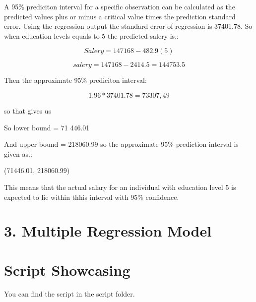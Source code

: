 \documentclass[
  letterpaper,
  DIV=11,
  numbers=noendperiod]{scrartcl}
\begin{document}
A 95\% prediciton interval for a specific observation can be calculated
as the predicted values plus or minus a critical value times the
prediction standard error. Using the regression output the standard
error of regression is 37401.78. So when education levels equals to 5
the predicted salery is.:~

\[
Salery=147168-482.9(5)
\]

\[
salery=147168-2414.5=144753.5
\]

Then the approximate 95\% prediciton interval:

\[
1.96*37401.78=73307,49
\]

so that gives us

So lower bound = 71 446.01

And upper bound = 218060.99 so the approximate 95\% prediction interval
is given as.:

(71446.01, 218060.99)

This means that the actual salary for an individual with education level
5 is expected to lie within thhis interval with 95\% confidence.

\section{3. Multiple Regression Model}\label{multiple-regression-model}

\section{Script Showcasing}\label{script-showcasing}

You can find the script in the script folder.
\end{document}
